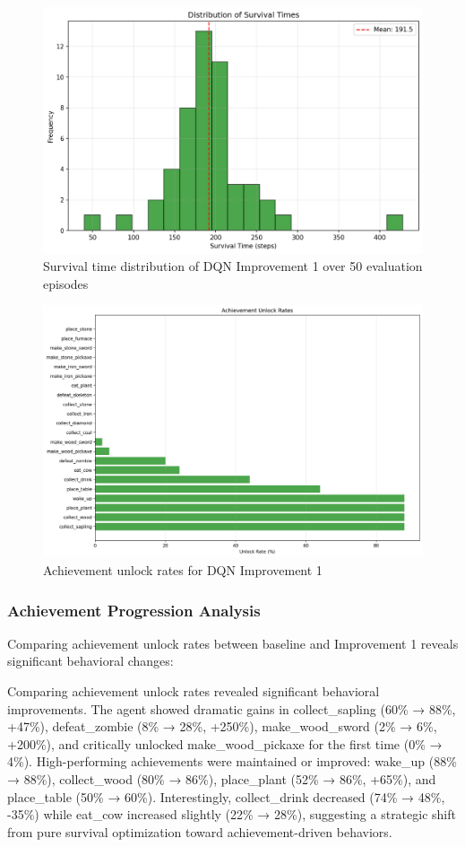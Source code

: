 \documentclass[twocolumn]{article}
\begin{document}
\begin{figure}[H]
    \centering
    \includegraphics[width=0.8\linewidth]{images/DQNImporv1survival_distribution.png}
    \caption{Survival time distribution of DQN Improvement 1 over 50 evaluation episodes}
    \label{fig:dqn_improv1_survival}
\end{figure}

\begin{figure}[H]
    \centering
    \includegraphics[width=0.8\linewidth]{images/DQNimprov1achievement_rates.png}
    \caption{Achievement unlock rates for DQN Improvement 1}
    \label{fig:dqn_improv1_achievements}
\end{figure}

\subsubsection*{Achievement Progression Analysis}

Comparing achievement unlock rates between baseline and Improvement 1 reveals significant behavioral changes:

Comparing achievement unlock rates revealed significant behavioral improvements. The agent showed dramatic gains in collect\_sapling (60\% → 88\%, +47\%), defeat\_zombie (8\% → 28\%, +250\%), make\_wood\_sword (2\% → 6\%, +200\%), and critically unlocked make\_wood\_pickaxe for the first time (0\% → 4\%). High-performing achievements were maintained or improved: wake\_up (88\% → 88\%), collect\_wood (80\% → 86\%), place\_plant (52\% → 86\%, +65\%), and place\_table (50\% → 60\%). Interestingly, collect\_drink decreased (74\% → 48\%, -35\%) while eat\_cow increased slightly (22\% → 28\%), suggesting a strategic shift from pure survival optimization toward achievement-driven behaviors.
\end{document}
